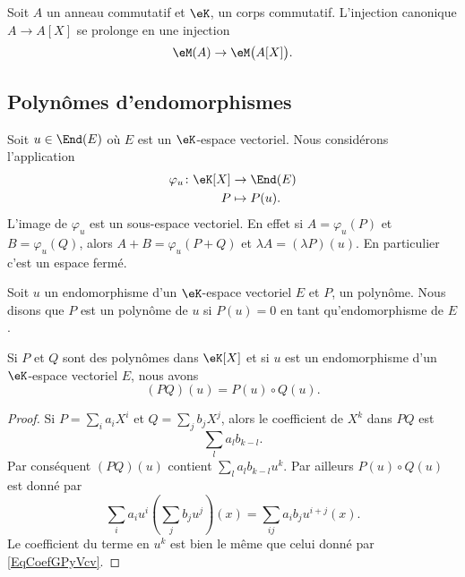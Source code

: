 Soit \( A\) un anneau commutatif et \( \eK\), un corps commutatif. L'injection canonique \( A\to A[X]\) se prolonge en une injection
\begin{equation}
	\eM(A)\to\eM\big( A[X] \big).
\end{equation}

\subsection{Polynômes d'endomorphismes}

Soit \( u\in\End(E)\) où \( E\) est un \( \eK\)-espace vectoriel. Nous considérons l'application
\begin{equation}    \label{EqOVKooeMJuv}
	\begin{aligned}
		\varphi_u\colon \eK[X] & \to \End(E)   \\
		P                      & \mapsto P(u).
	\end{aligned}
\end{equation}
L'image de \( \varphi_u\) est un sous-espace vectoriel. En effet si \( A=\varphi_u(P)\) et \( B=\varphi_u(Q)\), alors \( A+B=\varphi_u(P+Q)\) et \( \lambda A=(\lambda P)(u)\). En particulier c'est un espace fermé.

Soit \( u\) un endomorphisme d'un \( \eK\)-espace vectoriel \( E\) et \( P\), un polynôme. Nous disons que \( P\) est un polynôme  de \( u\) si \( P(u)=0\) en tant qu'endomorphisme de \( E\).

\begin{lemma}       \label{LemQWvhYb}
	Si \( P\) et \( Q\) sont des polynômes dans \( \eK[X]\) et si \( u\) est un endomorphisme d'un \( \eK\)-espace vectoriel \( E\), nous avons
	\begin{equation}
		(PQ)(u)=P(u)\circ Q(u).
	\end{equation}
\end{lemma}

\begin{proof}
	Si \( P=\sum_i a_iX^i\) et \( Q=\sum_j b_jX^j\), alors le coefficient de \( X^k\) dans \( PQ\) est
	\begin{equation}        \label{EqCoefGPyVcv}
		\sum_la_lb_{k-l}.
	\end{equation}
	Par conséquent \( (PQ)(u)\) contient \( \sum_la_lb_{k-l}u^k\). Par ailleurs \( P(u)\circ Q(u)\) est donné par
	\begin{equation}
		\sum_ia_iu^i\left( \sum_jb_ju^j \right)(x)=\sum_{ij}a_ib_ju^{i+j}(x).
	\end{equation}
	Le coefficient du terme en \( u^k\) est bien le même que celui donné par \eqref{EqCoefGPyVcv}.
\end{proof}

